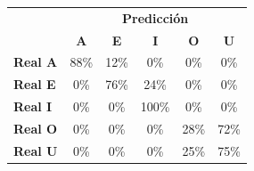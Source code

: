 \begin{tabular}{lccccc}
\toprule
 & \multicolumn{5}{c}{\textbf{Predicción}} \\
 & \textbf{A} & \textbf{E} & \textbf{I} & \textbf{O} & \textbf{U} \\
\midrule
\textbf{Real A} & \cellcolor[rgb]{0.39,0.39,1.00} \color{white} 88\% & \cellcolor[rgb]{0.91,0.91,1.00}  12\% & \cellcolor[rgb]{1.00,1.00,1.00}  0\% & \cellcolor[rgb]{1.00,1.00,1.00}  0\% & \cellcolor[rgb]{1.00,1.00,1.00}  0\% \\
\textbf{Real E} & \cellcolor[rgb]{1.00,1.00,1.00}  0\% & \cellcolor[rgb]{0.46,0.46,1.00} \color{white} 76\% & \cellcolor[rgb]{0.84,0.84,1.00}  24\% & \cellcolor[rgb]{1.00,1.00,1.00}  0\% & \cellcolor[rgb]{1.00,1.00,1.00}  0\% \\
\textbf{Real I} & \cellcolor[rgb]{1.00,1.00,1.00}  0\% & \cellcolor[rgb]{1.00,1.00,1.00}  0\% & \cellcolor[rgb]{0.30,0.30,1.00} \color{white} 100\% & \cellcolor[rgb]{1.00,1.00,1.00}  0\% & \cellcolor[rgb]{1.00,1.00,1.00}  0\% \\
\textbf{Real O} & \cellcolor[rgb]{1.00,1.00,1.00}  0\% & \cellcolor[rgb]{1.00,1.00,1.00}  0\% & \cellcolor[rgb]{1.00,1.00,1.00}  0\% & \cellcolor[rgb]{0.80,0.80,1.00}  28\% & \cellcolor[rgb]{0.50,0.50,1.00} \color{white} 72\% \\
\textbf{Real U} & \cellcolor[rgb]{1.00,1.00,1.00}  0\% & \cellcolor[rgb]{1.00,1.00,1.00}  0\% & \cellcolor[rgb]{1.00,1.00,1.00}  0\% & \cellcolor[rgb]{0.82,0.82,1.00}  25\% & \cellcolor[rgb]{0.48,0.48,1.00} \color{white} 75\% \\
\bottomrule
\end{tabular}
